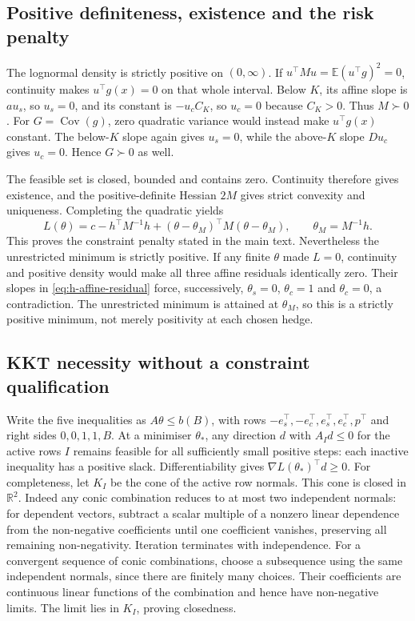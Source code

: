 \documentclass[11pt]{article}
\begin{document}
\subsection{Positive definiteness, existence and the risk penalty}

The lognormal density is strictly positive on $(0,\infty)$.
If $u^\top Mu=\mathbb E(u^\top g)^2=0$, continuity makes
$u^\top g(x)=0$ on that whole interval. Below $K$, its affine slope
is $au_s$, so $u_s=0$, and its constant is $-u_cC_K$, so
$u_c=0$ because $C_K>0$. Thus $M\succ0$.
For $G=\operatorname{Cov}(g)$, zero quadratic variance would instead
make $u^\top g(x)$ constant. The below-$K$ slope again gives
$u_s=0$, while the above-$K$ slope $Du_c$ gives $u_c=0$.
Hence $G\succ0$ as well.

The feasible set is closed, bounded and contains zero. Continuity
therefore gives existence, and the positive-definite Hessian $2M$
gives strict convexity and uniqueness. Completing the quadratic yields
\begin{equation}
 L(\theta)=c-h^\top M^{-1}h+
 (\theta-\theta_M)^\top M(\theta-\theta_M),\qquad
 \theta_M=M^{-1}h.
 \label{eq:h-square-completion}
\end{equation}
This proves the constraint penalty stated in the main text.
Nevertheless the unrestricted minimum is strictly positive. If any
finite $\theta$ made $L=0$, continuity and positive density would
make all three affine residuals identically zero. Their slopes
in \eqref{eq:h-affine-residual} force, successively, $\theta_s=0$,
$\theta_c=1$ and $\theta_c=0$, a contradiction. The unrestricted
minimum is attained at $\theta_M$, so this is a strictly positive
minimum, not merely positivity at each chosen hedge.

\subsection{KKT necessity without a constraint qualification}

Write the five inequalities as $A\theta\leq b(B)$, with rows
$-e_s^\top,-e_c^\top,e_s^\top,e_c^\top,p^\top$ and right sides
$0,0,1,1,B$. At a minimiser $\theta_*$, any direction $d$ with
$A_Id\leq0$ for the active rows $I$ remains feasible for all sufficiently
small positive steps: each inactive inequality has a positive slack.
Differentiability gives $\nabla L(\theta_*)^\top d\geq0$.
For completeness, let $K_I$ be the cone of the active row normals.
This cone is closed in $\mathbb R^2$. Indeed any conic combination
reduces to at most two independent normals: for dependent vectors,
subtract a scalar multiple of a nonzero linear dependence from the
non-negative coefficients until one coefficient vanishes, preserving
all remaining non-negativity. Iteration terminates with independence.
For a convergent sequence of conic combinations, choose a subsequence
using the same independent normals, since there are finitely many
choices. Their coefficients are continuous linear functions of the
combination and hence have non-negative limits. The limit lies in
$K_I$, proving closedness.
\end{document}
